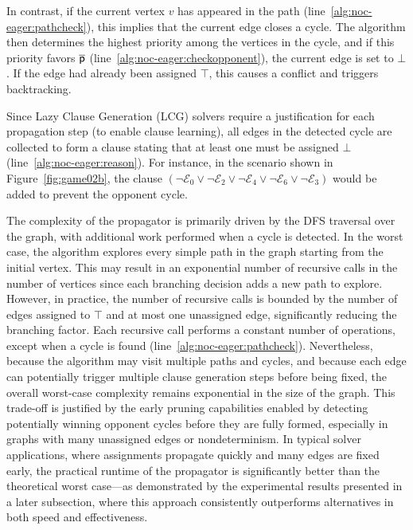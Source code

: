\documentclass[letterpaper]{article} %
\begin{document}
In contrast, if the current vertex $v$ has appeared in the path (line~\ref{alg:noc-eager:pathcheck}), this implies that the current edge closes a cycle. The algorithm then determines the highest priority among the vertices in the cycle, and if this priority favors $\opponent$ (line~\ref{alg:noc-eager:checkopponent}), the current edge is set to $\bot$. If the edge had already been assigned $\top$, this causes a conflict and triggers backtracking.

Since Lazy Clause Generation (LCG) solvers require a justification for each propagation step (to enable clause learning), all edges in the detected cycle are collected to form a clause stating that at least one must be assigned $\bot$ (line~\ref{alg:noc-eager:reason}). For instance, in the scenario shown in Figure~\ref{fig:game02b}, the clause $(\neg \mathcal{E}_0 \vee \neg \mathcal{E}_2 \vee \neg \mathcal{E}_4 \vee \neg \mathcal{E}_6 \vee \neg \mathcal{E}_3)$ would be added to prevent the opponent cycle.

The complexity of the \noceager propagator is primarily driven by the DFS traversal over the graph, with additional work performed when a cycle is detected. In the worst case, the algorithm explores every simple path in the graph starting from the initial vertex. This may result in an exponential number of recursive calls in the number of vertices since each branching decision adds a new path to explore. However, in practice, the number of recursive calls is bounded by the number of edges assigned to $\top$ and at most one unassigned edge, significantly reducing the branching factor. Each recursive call performs a constant number of operations, except when a cycle is found (line~\ref{alg:noc-eager:pathcheck}). Nevertheless, because the algorithm may visit multiple paths and cycles, and because each edge can potentially trigger multiple clause generation steps before being fixed, the overall worst-case complexity remains exponential in the size of the graph. This trade-off is justified by the early pruning capabilities enabled by detecting potentially winning opponent cycles before they are fully formed, especially in graphs with many unassigned edges or nondeterminism. In typical solver applications, where assignments propagate quickly and many edges are fixed early, the practical runtime of the propagator is significantly better than the theoretical worst case—as demonstrated by the experimental results presented in a later subsection, where this approach consistently outperforms alternatives in both speed and effectiveness.
\end{document}
